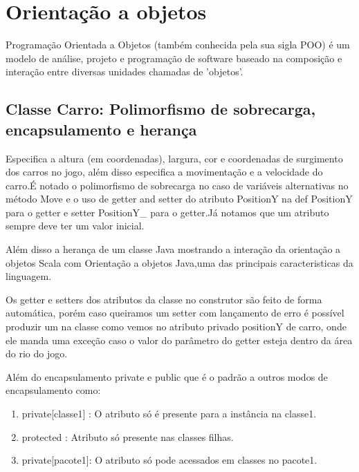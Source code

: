 \documentclass[rel-mlp]{iiufrgs}
\newenvironment{citacao}{
    \small
    \begin{list}{}{
        \setlength{\leftmargin}{4.0cm}
        \setstretch{1}
        \setlength{\topsep}{1.2cm}
        \setlength{\listparindent}{\parindent}
    }
    \item[]}{\end{list}
}
\begin{document}
\section{Orientação a objetos}

\begin{citacao}
Programação Orientada a Objetos (também conhecida pela sua sigla POO) é um modelo de análise, projeto e programação de software baseado na composição e interação entre diversas unidades chamadas de 'objetos'. \cite{wiki_oo}
\end{citacao}

\subsection{Classe Carro: Polimorfismo de sobrecarga, encapsulamento e herança}


 Especifica a altura (em coordenadas), largura, cor e coordenadas de surgimento dos carros no jogo, além disso especifica a movimentação e a velocidade do carro.É notado o polimorfismo de sobrecarga no caso de variáveis alternativas no método Move e o uso de getter and setter do atributo PositionY na def PositionY para o getter e setter PositionY\_  para o getter.Já notamos que um atributo sempre deve ter um valor inicial.
    
 Além disso a herança de um classe Java mostrando a interação da orientação a objetos Scala com Orientação a objetos Java,uma das principais caracteristicas da linguagem.

 Os getter e setters dos atributos da classe no construtor são feito de forma automática, porém caso queiramos um setter com lançamento de erro é possível produzir um na classe como vemos no atributo privado positionY de carro, onde ele manda uma exceção caso o valor do parâmetro do getter esteja dentro da área do rio do jogo.

 Além do encapsulamento private e public que é o padrão a outros modos de encapsulamento como:

\begin{enumerate}
    \item private[classe1] :  O atributo só é presente para a instância na classe1.
    \item protected : Atributo só presente nas classes filhas.
    \item private[pacote1]: O atributo só pode acessados em classes no pacote1.
\end{enumerate}
\end{document}
